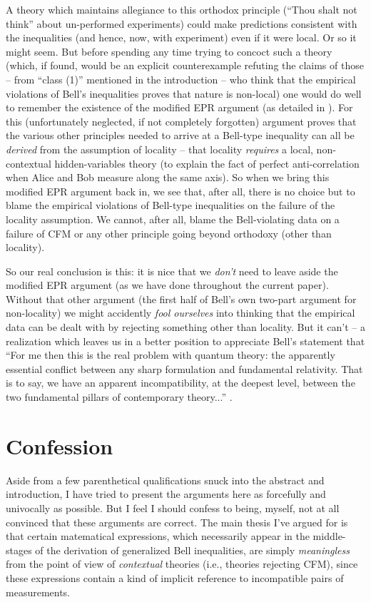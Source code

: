 \documentclass[aps,prc,onecolumn,12pt,nofootinbib]{revtex4-2}
\begin{document}
A theory which maintains allegiance to this orthodox principle (``Thou
shalt not think'' about un-performed experiments) could make
predictions consistent with the inequalities (and hence, now, with
experiment) even if it were local.  Or so it might seem.  But before
spending any time trying to concoct such a theory (which, if found,
would be an explicit counterexample refuting the claims of those -- from
``class (1)'' mentioned in the introduction -- who think that the
empirical violations of Bell's inequalities proves that nature is non-local)
one would do well to remember the existence of the modified EPR
argument (as detailed in \cite{nonlocchar}).  For this (unfortunately
neglected, if not completely forgotten) argument proves that the
various other principles needed to arrive at a Bell-type inequality can
all be \emph{derived} from the assumption of locality -- that locality
\emph{requires} a local, non-contextual hidden-variables theory (to
explain the fact of perfect anti-correlation when Alice and Bob measure
along the same axis).  So when we bring this modified EPR argument
back in, we see that, after all, there is no choice but to blame the
empirical violations of Bell-type inequalities on the failure of the
locality assumption.  We cannot, after all, blame the Bell-violating
data on a failure of CFM or any other principle going beyond
orthodoxy (other than locality).

So our real conclusion is this:
it is nice that we \emph{don't} need to leave aside the
modified EPR argument (as we have done throughout the current paper).
Without that other argument (the first half of Bell's own two-part
argument for non-locality) we might accidently \emph{fool ourselves}
into thinking that the empirical data can be dealt with by rejecting
something other than locality.  But it can't -- a realization
which leaves us in a better position
to appreciate Bell's statement that ``For me then this is
the real problem with quantum theory:  the apparently essential
conflict between any sharp formulation and fundamental relativity.
That is to say, we have an apparent incompatibility, at the deepest
level, between the two fundamental pillars of contemporary theory...''
\cite[pg 172]{bell}.


\section{Confession}

Aside from a few parenthetical qualifications snuck into the abstract
and introduction, I have tried to present the arguments here as
forcefully and univocally as possible.  But I feel I should confess to
being, myself, not at all convinced that these arguments are
correct.  The main thesis I've argued for is that certain matematical
expressions, which necessarily appear in the middle-stages of the
derivation of generalized Bell inequalities, are simply
\emph{meaningless} from the point of view of \emph{contextual}
theories (i.e., theories rejecting CFM), since these expressions
contain a kind of implicit reference to incompatible pairs of
measurements.
\end{document}
